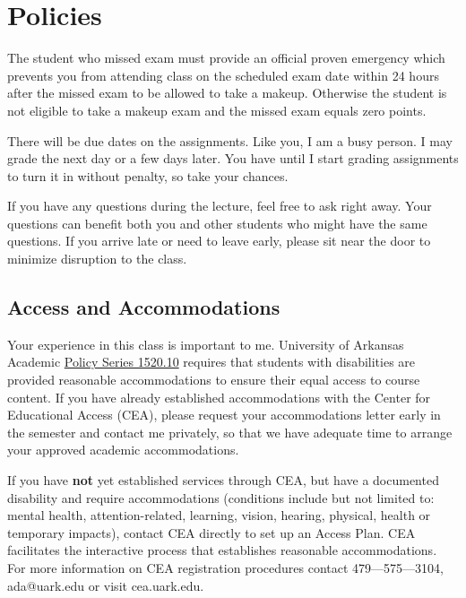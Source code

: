 \documentclass[12pt]{article}
\begin{document}
\section*{Policies}

The student who missed exam must provide an official proven emergency which prevents you from attending class on the scheduled exam date within 24 hours after the missed exam to be allowed to take a makeup. Otherwise the student is not eligible to take a makeup exam and the missed exam equals zero points.

There will be due dates on the assignments. Like you, I am a busy person. I may grade the next day or a few days later. You have until I start grading assignments to turn it in without penalty, so take your chances. 

If you have any questions during the lecture, feel free to ask right away. Your questions can benefit both you and other students who might have the same questions. If you arrive late or need to leave early, please sit near the door to minimize disruption to the class.

\subsection*{Access and Accommodations}

Your experience in this class is important to me. University of Arkansas Academic \href{https://policies.uark.edu/academic/152010.php}{Policy Series 1520.10} requires that students with disabilities are provided reasonable accommodations to ensure their equal access to course content. If you have already established accommodations with the Center for Educational Access (CEA), please request your accommodations letter early in the semester and contact me privately, so that we have adequate time to arrange your approved academic accommodations.

If you have \textbf{not} yet established services through CEA, but have a documented disability and require accommodations (conditions include but not limited to: mental health, attention-related, learning, vision, hearing, physical, health  or temporary impacts), contact CEA directly to set up an Access Plan. CEA facilitates the interactive process that establishes reasonable accommodations.  For more information on CEA registration procedures contact 479—575—3104, ada@uark.edu or visit cea.uark.edu.
\end{document}
